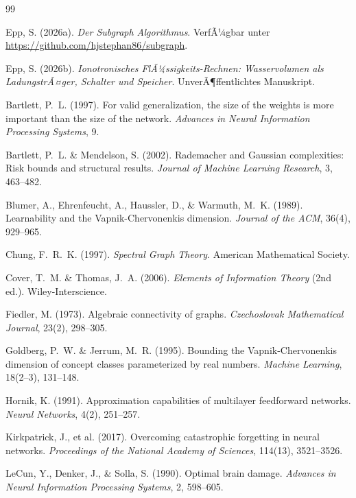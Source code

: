 ﻿\documentclass[12pt, a4paper, openany]{report}
\begin{document}
\begin{thebibliography}{99}

Epp, S. (2026a).
\newblock \textit{Der Subgraph Algorithmus}. VerfÃ¼gbar unter \url{https://github.com/hjstephan86/subgraph}.

Epp, S. (2026b).
\newblock \textit{Ionotronisches FlÃ¼ssigkeits-Rechnen: Wasservolumen als LadungstrÃ¤ger,
  Schalter und Speicher}. UnverÃ¶ffentlichtes Manuskript.

Bartlett, P.~L. (1997).
For valid generalization, the size of the weights is more important than
the size of the network.
\textit{Advances in Neural Information Processing Systems}, 9.

Bartlett, P.~L. \& Mendelson, S. (2002).
Rademacher and Gaussian complexities: Risk bounds and structural results.
\textit{Journal of Machine Learning Research}, 3, 463--482.

Blumer, A., Ehrenfeucht, A., Haussler, D., \& Warmuth, M.~K. (1989).
Learnability and the Vapnik-Chervonenkis dimension.
\textit{Journal of the ACM}, 36(4), 929--965.

Chung, F.~R.~K. (1997).
\textit{Spectral Graph Theory}.
American Mathematical Society.

Cover, T.~M. \& Thomas, J.~A. (2006).
\textit{Elements of Information Theory} (2nd ed.).
Wiley-Interscience.

Fiedler, M. (1973).
Algebraic connectivity of graphs.
\textit{Czechoslovak Mathematical Journal}, 23(2), 298--305.

Goldberg, P.~W. \& Jerrum, M.~R. (1995).
Bounding the Vapnik-Chervonenkis dimension of concept classes
parameterized by real numbers.
\textit{Machine Learning}, 18(2--3), 131--148.

Hornik, K. (1991).
Approximation capabilities of multilayer feedforward networks.
\textit{Neural Networks}, 4(2), 251--257.

Kirkpatrick, J., et al. (2017).
Overcoming catastrophic forgetting in neural networks.
\textit{Proceedings of the National Academy of Sciences}, 114(13), 3521--3526.

LeCun, Y., Denker, J., \& Solla, S. (1990).
Optimal brain damage.
\textit{Advances in Neural Information Processing Systems}, 2, 598--605.


\end{thebibliography}
\end{document}
